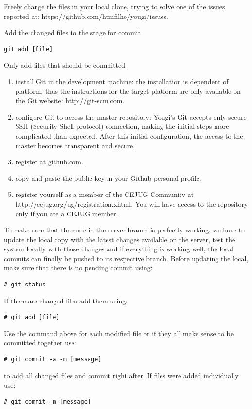 \documentclass[envcountsame,envcountchap]{svmono}
\begin{document}
Freely change the files in your local clone, trying to solve one of the issues reported at: https://github.com/htmfilho/yougi/issues.

Add the changed files to the stage for commit

\begin{verbatim}
git add [file]
\end{verbatim}

Only add files that should be committed.

\begin{enumerate}
\item install Git in the development machine: the installation is dependent of platform, thus the instructions for the target platform are only available on the Git website: http://git-scm.com.
\item configure Git to access the master repository: Yougi's Git accepts only secure SSH (Security Shell protocol) connection, making the initial steps more complicated than expected. After this initial configuration, the access to the master becomes transparent and secure.
\item register at github.com.
\item copy and paste the public key in your Github personal profile.
\item register yourself as a member of the CEJUG Community at \\ http://cejug.org/ug/registration.xhtml. You will have access to the repository only if you are a CEJUG member.
\end{enumerate}

To make sure that the code in the server branch is perfectly working, we have to update the local copy with the latest changes available on the server, test the system locally with those changes and if everything is working well, the local commits can finally be pushed to its respective branch. Before updating the local, make sure that there is no pending commit using:
\begin{verbatim}
# git status
\end{verbatim}
If there are changed files add them using:
\begin{verbatim}
# git add [file]
\end{verbatim}
Use the command above for each modified file or if they all make sense to be committed together use:
\begin{verbatim}
# git commit -a -m [message]
\end{verbatim}
to add all changed files and commit right after. If files were added individually use:
\begin{verbatim}
# git commit -m [message]
\end{verbatim}
\end{document}

